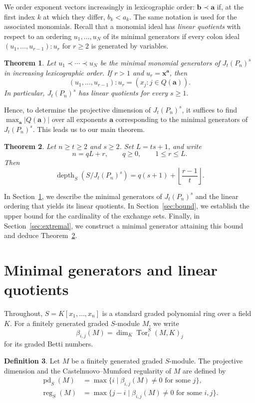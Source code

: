\documentclass[12pt]{amsart}
\newtheorem{theorem}{Theorem}[section]
\theoremstyle{definition}
\newtheorem{definition}[theorem]{Definition}
\theoremstyle{remark}
\numberwithin{equation}{section}
\DeclareMathOperator{\depth}{depth}
\DeclareMathOperator{\pd}{pd}
\DeclareMathOperator{\reg}{reg}
\begin{document}
We order exponent vectors increasingly in lexicographic order: $\mathbf{b} \prec \mathbf{a}$ if, at the first index $k$ at which they differ, $b_k < a_k$. The same notation is used for the associated monomials. Recall that a monomial ideal has \emph{linear quotients} with respect to an ordering $u_1, \ldots, u_N$ of its minimal generators if every colon ideal $(u_1, \ldots, u_{r-1}) : u_r$ for $r \ge 2$ is generated by variables.

\begin{theorem}\label{thm:linear-quotients}
Let $u_1 \prec \cdots \prec u_N$ be the minimal monomial generators of $J_t(P_n)^s$ in increasing lexicographic order. If $r > 1$ and $u_r = \mathbf{x}^{\mathbf{a}}$, then
$$
(u_1, \ldots, u_{r-1}) : u_r = (x_j : j \in Q(\mathbf{a})).$$
In particular, $J_t(P_n)^s$ has linear quotients for every $s \ge 1$.
\end{theorem}

Hence, to determine the projective dimension of $J_t(P_n)^s$, it suffices to find $\max_{\mathbf{a}} |Q(\mathbf{a})|$ over all exponents $\mathbf{a}$ corresponding to the minimal generators of $J_t(P_n)^s$. This leads us to our main theorem.

\begin{theorem}\label{thm:main}
Let $n \ge t \ge 2$ and $s \ge 2$. Set $L = ts + 1$, and write
\[
n = qL + r, \qquad q \ge 0, \qquad 1 \le r \le L.
\]
Then
$$
\depth_S(S / J_t(P_n)^s) = q(s+1) + \left\lfloor \frac{r-1}{t} \right\rfloor.$$
\end{theorem}

In Section~\ref{sec:covers}, we describe the minimal generators of $J_t(P_n)^s$ and the linear ordering that yields its linear quotients. In Section~\ref{sec:bound}, we establish the upper bound for the cardinality of the exchange sets. Finally, in Section~\ref{sec:extremal}, we construct a minimal generator attaining this bound and deduce Theorem~\ref{thm:main}.

\section{Minimal generators and linear quotients}\label{sec:covers}
Throughout, $S = K[x_1, \ldots, x_n]$ is a standard graded polynomial ring over a field $K$. For a finitely generated graded $S$-module $M$, we write
\[
\beta_{i,j}(M) = \dim_K \operatorname{Tor}_i^S(M, K)_j
\]
for its graded Betti numbers.

\begin{definition}
Let $M$ be a finitely generated graded $S$-module. The projective dimension and the Castelnuovo--Mumford regularity of $M$ are defined by
\begin{align*}
\pd_S(M) &= \max \{ i \mid \beta_{i,j}(M) \neq 0 \text{ for some } j \}, \\
\reg_S(M) &= \max \{ j - i \mid \beta_{i,j}(M) \neq 0 \text{ for some } i, j \}.
\end{align*}
\end{definition}
\end{document}
